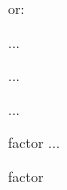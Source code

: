 \begin{latex}
\linespread{1.3} %
\linespread{1.6} %
\end{latex}
or:
\begin{latex}
\singlespacing
\doublespacing

\begin{singlespace}  ...\end{singlespace}
\begin{doublespace}  ...\end{doublespace}
\begin{onehalfspace}  ...\end{onehalfspace}
\begin{spacing}{factor}  ...\end{spacing}{factor}

\end{latex}

